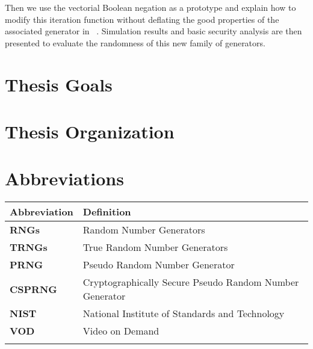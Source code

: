 Then we use the vectorial Boolean negation as a
prototype and explain how to modify this iteration function
without deflating the good properties of the associated generator in ~\cite{bfgw11:ip}.
Simulation results and basic security analysis are then presented
to evaluate the randomness of this new family of generators.

\section{Thesis Goals}


\section{Thesis Organization}


\section{Abbreviations}
\begin{tabular}{ll}\toprule
\textbf{Abbreviation}& \textbf{Definition}\\\hline
\textbf{RNGs}& Random Number Generators\\
\textbf{TRNGs}& True Random Number Generators\\
\textbf{PRNG}& Pseudo Random Number Generator\\
\textbf{CSPRNG}& Cryptographically Secure Pseudo Random Number Generator\\
\textbf{NIST}& National Institute of Standards and Technology\\
\textbf{VOD}&Video on Demand\\\bottomrule
\textbf{}& \\
\end{tabular}
 

